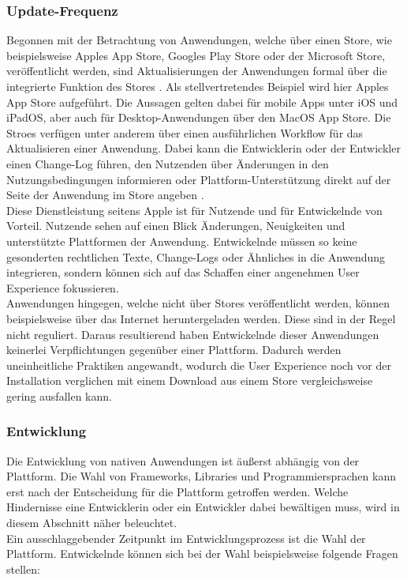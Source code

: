 \documentclass[a4paper]{scrartcl}
\begin{document}
\subsubsection{Update-Frequenz}

Begonnen mit der Betrachtung von Anwendungen, welche über einen Store, wie beispielsweise Apples App Store, Googles Play Store oder der Microsoft Store, veröffentlicht werden, sind Aktualisierungen der Anwendungen formal über die integrierte Funktion des Stores \autocite[28]{Jobe}. Als stellvertretendes Beispiel wird hier Apples App Store aufgeführt. Die Aussagen gelten dabei für mobile Apps unter iOS und iPadOS, aber auch für Desktop-Anwendungen über den MacOS App Store. Die Stroes verfügen unter anderem über einen ausführlichen Workflow für das Aktualisieren einer Anwendung. Dabei kann die Entwicklerin oder der Entwickler einen Change-Log führen, den Nutzenden über Änderungen in den Nutzungsbedingungen informieren oder Plattform-Unterstützung direkt auf der Seite der Anwendung im Store angeben \autocite{Appstore_Updates}. \\
Diese Dienstleistung seitens Apple ist für Nutzende und für Entwickelnde von Vorteil. Nutzende sehen auf einen Blick Änderungen, Neuigkeiten und unterstützte Plattformen der Anwendung. Entwickelnde müssen so keine gesonderten rechtlichen Texte, Change-Logs oder Ähnliches in die Anwendung integrieren, sondern können sich auf das Schaffen einer angenehmen User Experience fokussieren. \\

Anwendungen hingegen, welche nicht über Stores veröffentlicht werden, können beispielsweise über das Internet heruntergeladen werden. Diese sind in der Regel nicht reguliert. Daraus resultierend haben Entwickelnde dieser Anwendungen keinerlei Verpflichtungen gegenüber einer Plattform. Dadurch werden uneinheitliche Praktiken angewandt, wodurch die User Experience noch vor der Installation verglichen mit einem Download aus einem Store vergleichsweise gering ausfallen kann. 


\subsubsection{Entwicklung}

Die Entwicklung von nativen Anwendungen ist äußerst abhängig von der Plattform. Die Wahl von Frameworks, Libraries und Programmiersprachen kann erst nach der Entscheidung für die Plattform getroffen werden. Welche Hindernisse eine Entwicklerin oder ein Entwickler dabei bewältigen muss, wird in diesem Abschnitt näher beleuchtet. \\
Ein ausschlaggebender Zeitpunkt im Entwicklungsprozess ist die Wahl der Plattform. Entwickelnde können sich bei der Wahl beispielsweise folgende Fragen stellen: 
\end{document}
